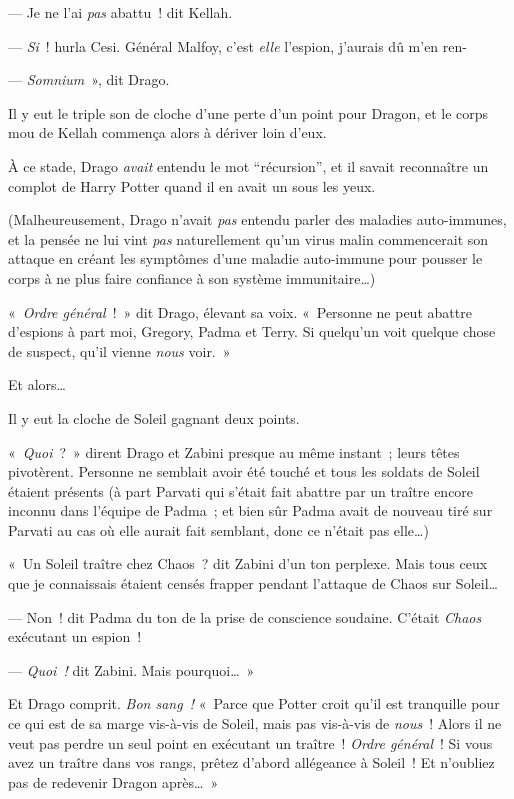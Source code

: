 --- Je ne l'ai \emph{pas} abattu~! dit Kellah.

--- \emph{Si}~! hurla Cesi. Général Malfoy, c'est \emph{elle} l'espion, j'aurais dû m'en ren-

--- \emph{Somnium}~», dit Drago.

Il y eut le triple son de cloche d'une perte d'un point pour Dragon, et le corps mou de Kellah commença alors à dériver loin d'eux.

À ce stade, Drago \emph{avait} entendu le mot “récursion”, et il savait reconnaître un complot de Harry Potter quand il en avait un sous les yeux.

(Malheureusement, Drago n'avait \emph{pas} entendu parler des maladies auto-immunes, et la pensée ne lui vint \emph{pas} naturellement qu'un virus malin commencerait son attaque en créant les symptômes d'une maladie auto-immune pour pousser le corps à ne plus faire confiance à son système immunitaire…)

«~\emph{Ordre général}~!~» dit Drago, élevant sa voix. «~Personne ne peut abattre d'espions à part moi, Gregory, Padma et Terry. Si quelqu'un voit quelque chose de suspect, qu'il vienne \emph{nous} voir.~»

Et alors…

Il y eut la cloche de Soleil gagnant deux points.

«~\emph{Quoi}~?~» dirent Drago et Zabini presque au même instant~; leurs têtes pivotèrent. Personne ne semblait avoir été touché et tous les soldats de Soleil étaient présents (à part Parvati qui s'était fait abattre par un traître encore inconnu dans l'équipe de Padma~; et bien sûr Padma avait de nouveau tiré sur Parvati au cas où elle aurait fait semblant, donc ce n'était pas elle…)

«~Un Soleil traître chez Chaos~? dit Zabini d'un ton perplexe. Mais tous ceux que je connaissais étaient censés frapper pendant l'attaque de Chaos sur Soleil…

--- Non~! dit Padma du ton de la prise de conscience soudaine. C'était \emph{Chaos} exécutant un espion~!

--- \emph{Quoi~!} dit Zabini. Mais pourquoi…~»

Et Drago comprit. \emph{Bon sang~!} «~Parce que Potter croit qu'il est tranquille pour ce qui est de sa marge vis-à-vis de Soleil, mais pas vis-à-vis de \emph{nous}~! Alors il ne veut pas perdre un seul point en exécutant un traître~! \emph{Ordre général}~! Si vous avez un traître dans vos rangs, prêtez d'abord allégeance à Soleil~! Et n'oubliez pas de redevenir Dragon après…~»

